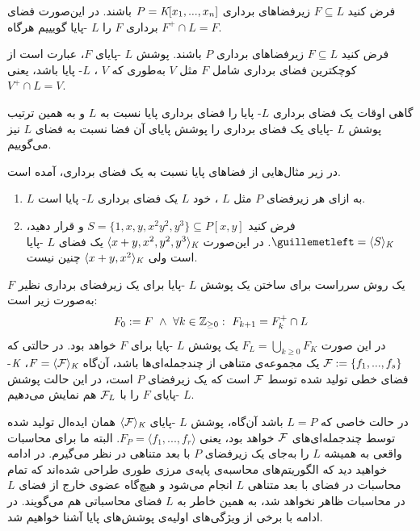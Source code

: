 \begin{definition}
فرض کنید 
$F\subseteq L$
زیرفضاهای برداری 
$P = \textit{K}[x_{1},...,x_{n}]$
باشند. در این‌صورت فضای برداری
$F$
را 
$L$
-پایا 
گویییم هرگاه 
$F^{+}\cap L = F$.
\end{definition}

\begin{definition}
فرض کنید 
$F\subseteq L$
زیرفضاهای برداری 
$P$
باشند. پوشش 
$L$
-پایای 
$F$،
عبارت است از کوچکترین فضای برداری شامل 
$F$
مثل 
$V$
به‌طوری که 
$V$
،
$L$-
پایا باشد، یعنی
$V^{+}\cap L = V$.
\end{definition}
گاهی اوقات یک فضای برداری 
$L$-
پایا را فضای برداری پایا نسبت به 
$L$
و  به همین ترتیب  پوشش 
$L$
-پایای یک فضای برداری را پوشش پایای آن فضا نسبت به فضای 
$L$
نیز  می‌گوییم.

\begin{example}
در زیر مثال‌هایی از فضاهای پایا نسبت به یک فضای برداری، آمده است.
\begin{enumerate}
\item
$L$
به ازای هر زیرفضای 
$P$
مثل 
$L$
، خود 
$L$
یک فضای برداری 
$L$-
پایا است. 
\item
فرض کنید 
$S = \{1, x, y, x^{2}y^{2}, y^{3}\}\subseteq P[x,y]$
و قرار دهید، 
$« = \langle S\rangle_{\fld}$.
در این‌صورت 
$\langle x + y, x^{2}, y^{2}, y^{3} \rangle_{\textit{K}}$
یک فضای 
$L$
-پایا است ولی 
$\langle x + y, x^{2} \rangle_{\textit{K}}$
چنین نیست. 
\end{enumerate}
\end{example}
 یک روش سرراست برای ساختن یک پوشش 
 $L$
 -پایا برای یک زیرفضای برداری نظیر 
 $F$
 به‌صورت زیر است:
 $$F_{0}: = F \ \wedge \ \forall k\in \mathbb{Z}_{\geq 0} :\ F_{k+1} = F_{k}^{+}\cap L$$
 در این صورت 
 $F_{L} = \bigcup_{k\geq 0}F_{K}$
 یک پوشش 
 $L$
 -پایا برای 
 $F$
 خواهد بود. در حالتی که 
 ${\mathcal F}:= \{f_{1},...,f_{s}\}$
 یک مجموعه‌ی متناهی از چندجمله‌ای‌ها باشد، آن‌گاه 
 $F = \langle {\mathcal F}\rangle_{\textit{K}}$،
 $\textit{K}$-
 فضای خطی تولید شده توسط 
 ${\mathcal F}$
 است که یک زیرفضای 
 $P$
 است، در این حالت پوشش 
 $L$
 -پایای 
 $F$
 را با 
 ${\mathcal F}_{L}$
 هم نمایش می‌دهیم. 
 
 در حالت خاصی که 
 $L = P$
 باشد آن‌گاه، پوشش 
 $L$
 -پایای 
 $\langle{\mathcal F}\rangle_{\textit{K}}$
همان ایده‌ال تولید شده توسط چندجمله‌ای‌های 
${\mathcal F}$
خواهد بود،  یعنی 
$F_{P} = \langle f_{1},...,f_{r}\rangle$.
البته ما برای محاسبات واقعی به همیشه 
$L$
را به‌جای یک زیرفضای 
$P$
با بعد متناهی در نظر می‌گیرم. در ادامه خواهید دید که الگوریتم‌های محاسبه‌ی پایه‌ی مرزی طوری طراحی‌ شده‌اند که تمام محاسبات در فضای با بعد متناهی 
$L$
انجام می‌شود و هیچ‌گاه عضوی خارج از فضای 
$L$
در محاسبات ظاهر نخواهد شد، به همین خاطر به 
$L$
فضای محاسباتی هم می‌گویند. در ادامه با برخی از ویژگی‌های اولیه‌ی پوشش‌های پایا آشنا خواهیم شد. 


